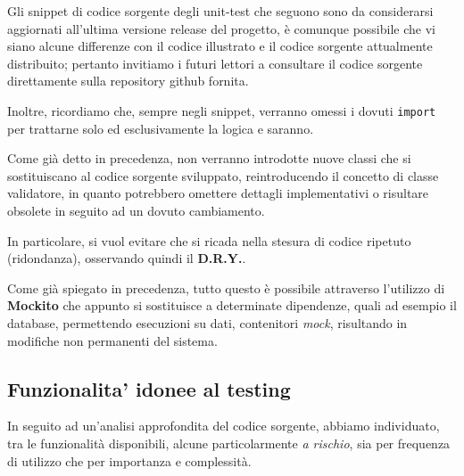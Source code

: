 \begin{info}
	Gli snippet di codice sorgente degli unit-test che seguono sono da considerarsi aggiornati
	all'ultima versione release del progetto, è comunque possibile che vi siano 
	alcune differenze con il codice illustrato e il codice sorgente attualmente distribuito; pertanto
	invitiamo i futuri lettori a consultare il codice sorgente direttamente sulla repository github
	fornita.
	\par\vspace{3mm}
	Inoltre, ricordiamo che, sempre negli snippet, verranno omessi i dovuti \texttt{import}
	per trattarne solo ed esclusivamente la logica e saranno.
\end{info}
%
\begin{warn}
	Come già detto in precedenza, non verranno introdotte nuove classi che si sostituiscano
	al codice sorgente sviluppato, reintroducendo il concetto di classe validatore, 
	in quanto potrebbero omettere dettagli implementativi o risultare obsolete 
	in seguito ad un dovuto cambiamento.
	\par\vspace{3mm}
	In particolare, si vuol evitare che si ricada nella stesura di codice ripetuto (ridondanza),
	osservando quindi il \textbf{D.R.Y.}\footnotemark.
	\par\vspace{3mm}
	Come già spiegato in precedenza, tutto questo è possibile attraverso l'utilizzo di \textbf{Mockito}
	che appunto si sostituisce a determinate dipendenze, quali ad esempio il database, permettendo
	esecuzioni su dati, contenitori \textit{mock}, risultando in modifiche non permanenti del sistema.
\end{warn}


\newpage
\subsection*{Funzionalita' idonee al testing}
In seguito ad un'analisi approfondita del codice sorgente, abbiamo individuato,
tra le funzionalità disponibili, alcune particolarmente \textit{a rischio}, sia
per frequenza di utilizzo che per importanza e complessità.

